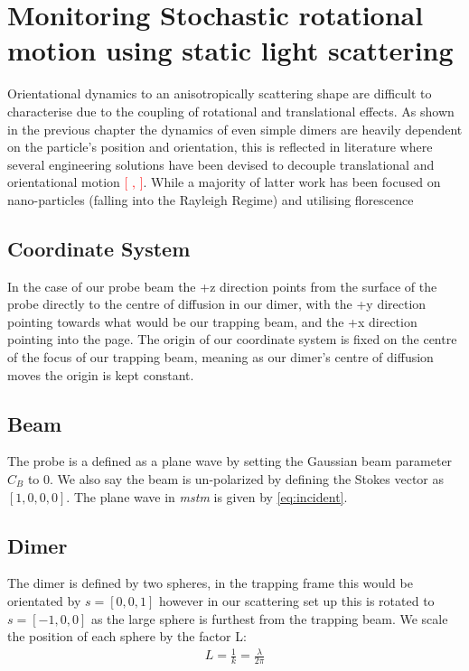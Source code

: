 \section{Monitoring Stochastic rotational motion using static light scattering}
Orientational dynamics to an anisotropically scattering shape are difficult to 
characterise due to the coupling of rotational and translational effects. As 
shown in the previous chapter the dynamics of even simple dimers are heavily 
dependent on the particle's position and orientation, this is reflected in 
literature where several engineering solutions have been devised to decouple 
translational and orientational motion \textcolor{red}{[ , ]}. While a majority 
of latter work has been focused on nano-particles (falling into the Rayleigh 
Regime) and utilising florescence 

\subsection{Coordinate System}
In the case of our probe beam the +z direction points from the surface of the 
probe directly to the centre of diffusion in our dimer, with the +y direction 
pointing towards what would be our trapping beam, and the +x direction pointing 
into the page. The origin of our coordinate system is fixed on the centre of 
the focus of our trapping beam, meaning as our dimer's centre of diffusion moves 
the origin is kept constant.

\subsection{Beam}
The probe is a defined as a plane wave by setting the Gaussian beam parameter 
$C_B$ to 0. We also say the beam is un-polarized by defining the Stokes vector 
as $[1,0,0,0]$. The plane wave in \textit{mstm} is given by \eqref{eq:incident}. 

\subsection{Dimer}
The dimer is defined by two spheres, in the trapping frame this would be orientated 
by $s=[0,0,1]$ however in our scattering set up this is rotated to $s=[-1,0,0]$ as 
the large sphere is furthest from the trapping beam. We scale the position of each 
sphere by the factor L:
\begin{align}
	L = \frac{1}{k} = \frac{\lambda}{2\pi}
\end{align}

